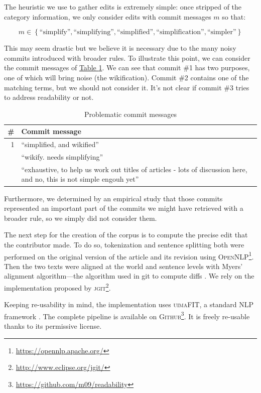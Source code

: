 \documentclass[a4paper, 11pt, onepage]{scrreprt}
\newcommand\tableref[1]{\hyperref[#1]{Table \ref*{#1}}}
\begin{document}
The heuristic we use to gather edits is extremely simple: once
stripped of the category information, we only consider edits with
commit messages $m$ so that:

\[
m \in \left\{\text{“simplify”}, \text{“simplifying”},
  \text{“simplified”}, \text{“simplification”},
  \text{“simpler”}\right\}
\]

This may seem drastic but we believe it is necessary due to the many
noisy commits introduced with broader rules. To illustrate this point,
we can consider the commit messages of
\tableref{tab:problematic-commits}. We can see that commit \#1 has two
purposes, one of which will bring noise (the wikification). Commit \#2
contains one of the matching terms, but we should not consider
it. It's not clear if commit \#3 tries to address readability or not.

\begin{table}[H]
  \centering
  \caption{Problematic commit messages}
  \begin{tabular}{rp{12cm}}
    \toprule
    \# & Commit message \\
    \midrule
    1 & “simplified, and wikified” \\
    \addlinespace
    2 & “wikify. needs simplifying” \\
    \addlinespace
    3 & “exhaustive, to help us work out titles of articles - lots of
    discussion here, and no, this is not simple engouh yet” \\
  \end{tabular}
  \label{tab:problematic-commits}
\end{table}

Furthermore, we determined by an empirical study that those commits
represented an important part of the commits we might have retrieved
with a broader rule, so we simply did not consider them.

The next step for the creation of the corpus is to compute the precise
edit that the contributor made. To do so, tokenization and sentence
splitting both were performed on the original version of the article
and its revision using
\textsc{OpenNLP}\footnote{\url{https://opennlp.apache.org/}}. Then the
two texts were aligned at the world and sentence levels with Myers'
alignment algorithm—the algorithm used in git to compute diffs
\cite{myers1988optimal}. We rely on the implementation proposed by
\textsc{jgit}\footnote{\url{http://www.eclipse.org/jgit/}}.

Keeping re-usability in mind, the implementation uses
\textsc{uimaFIT}, a standard NLP framework
\cite{ogren-bethard:2009:SETQA-NLP}. The complete pipeline is
available on
\textsc{Github}\footnote{\url{https://github.com/m09/readability}}. It
is freely re-usable thanks to its permissive license.
\end{document}
